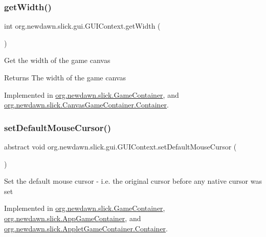 \subsubsection{\texorpdfstring{get\+Width()}{getWidth()}}
{\footnotesize\ttfamily int org.\+newdawn.\+slick.\+gui.\+G\+U\+I\+Context.\+get\+Width (\begin{DoxyParamCaption}{ }\end{DoxyParamCaption})}

Get the width of the game canvas

\begin{DoxyReturn}{Returns}
The width of the game canvas 
\end{DoxyReturn}


Implemented in \mbox{\hyperlink{classorg_1_1newdawn_1_1slick_1_1_game_container_a938fe1a28567182445e60450915d5f69}{org.\+newdawn.\+slick.\+Game\+Container}}, and \mbox{\hyperlink{classorg_1_1newdawn_1_1slick_1_1_canvas_game_container_1_1_container_af5d516263e9340c38d73937f4842de33}{org.\+newdawn.\+slick.\+Canvas\+Game\+Container.\+Container}}.

\mbox{\label{interfaceorg_1_1newdawn_1_1slick_1_1gui_1_1_g_u_i_context_a665c6e15e417418eccf462a1ec957b1a}} 
\subsubsection{\texorpdfstring{set\+Default\+Mouse\+Cursor()}{setDefaultMouseCursor()}}
{\footnotesize\ttfamily abstract void org.\+newdawn.\+slick.\+gui.\+G\+U\+I\+Context.\+set\+Default\+Mouse\+Cursor (\begin{DoxyParamCaption}{ }\end{DoxyParamCaption})\hspace{0.3cm}{\ttfamily [abstract]}}

Set the default mouse cursor -\/ i.\+e. the original cursor before any native cursor was set 

Implemented in \mbox{\hyperlink{classorg_1_1newdawn_1_1slick_1_1_game_container_aafbac3cb7c8bb30af0bcafa4b86e33a0}{org.\+newdawn.\+slick.\+Game\+Container}}, \mbox{\hyperlink{classorg_1_1newdawn_1_1slick_1_1_app_game_container_acfe3089f87d1952e61f3d2f1572ee5ee}{org.\+newdawn.\+slick.\+App\+Game\+Container}}, and \mbox{\hyperlink{classorg_1_1newdawn_1_1slick_1_1_applet_game_container_1_1_container_a563df6ad2a0918faa30545da4ed48cb0}{org.\+newdawn.\+slick.\+Applet\+Game\+Container.\+Container}}.

